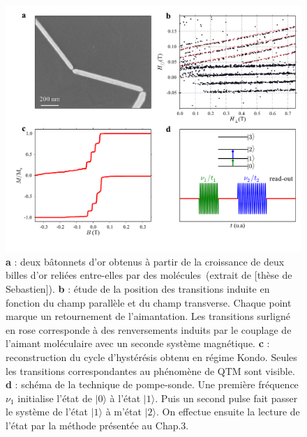 \begin{figure}
\centering \includegraphics[scale=0.45]{Conclusion/Perspectives/Perspectives.pdf} 
\caption{\textbf{a} : deux bâtonnets d'or obtenus à partir de la croissance de deux billes d'or reliées entre-elles par des molécules~(extrait de [thèse de Sebastien]). \textbf{b} : étude de la position des transitions induite en fonction du champ parallèle et du champ transverse. Chaque point marque un retournement de l'aimantation. Les transitions surligné en rose corresponde à des renversements induits par le couplage de l'aimant moléculaire avec un seconde système magnétique. \textbf{c} : reconstruction du cycle d'hystérésis obtenu en régime Kondo. Seules les transitions correspondantes au phénomène de QTM sont visible. \textbf{d} : schéma de la technique de pompe-sonde. Une première fréquence $\nu_1$ initialise l'état de $|0\rangle$ à l'état $|1\rangle$. Puis un second pulse fait passer le système de l'état $|1\rangle$ à m'état $|2\rangle$. On effectue ensuite la lecture de l'état par la méthode présentée au Chap.3.}
\label{Perspectives}
\end{figure}

